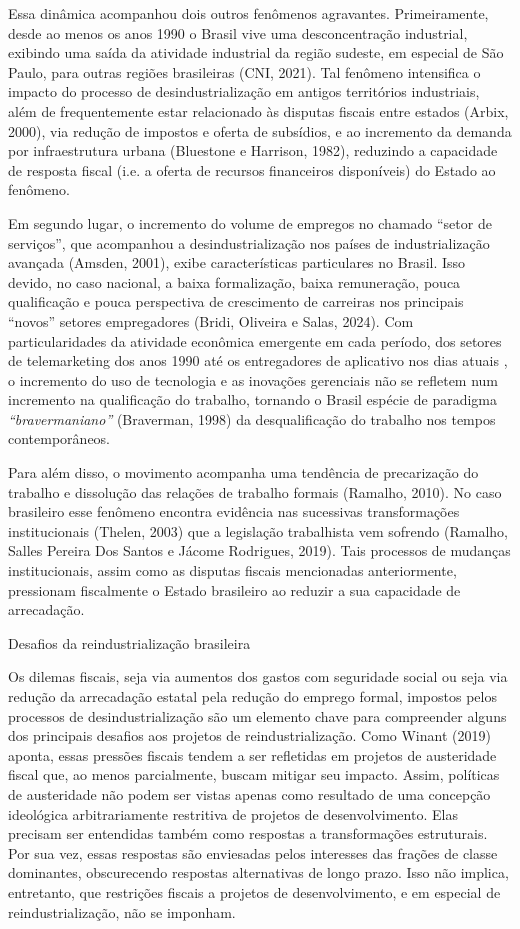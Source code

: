 Essa dinâmica acompanhou dois outros fenômenos agravantes.
Primeiramente, desde ao menos os anos 1990 o Brasil vive uma
desconcentração industrial, exibindo uma saída da atividade industrial
da região sudeste, em especial de São Paulo, para outras regiões
brasileiras (CNI, 2021). Tal fenômeno intensifica o impacto do processo
de desindustrialização em antigos territórios industriais, além de
frequentemente estar relacionado às disputas fiscais entre estados
(Arbix, 2000), via redução de impostos e oferta de subsídios, e ao
incremento da demanda por infraestrutura urbana (Bluestone e Harrison,
1982), reduzindo a capacidade de resposta fiscal (i.e. a oferta de
recursos financeiros disponíveis) do Estado ao fenômeno.

Em segundo lugar, o incremento do volume de empregos no chamado ``setor
de serviços'', que acompanhou a desindustrialização nos países de
industrialização avançada (Amsden, 2001), exibe características
particulares no Brasil. Isso devido, no caso nacional, a baixa
formalização, baixa remuneração, pouca qualificação e pouca perspectiva
de crescimento de carreiras nos principais ``novos'' setores
empregadores (Bridi, Oliveira e Salas, 2024). Com particularidades da
atividade econômica emergente em cada período, dos setores de
telemarketing dos anos 1990 até os entregadores de aplicativo nos dias
atuais , o incremento do uso de tecnologia e as inovações gerenciais não
se refletem num incremento na qualificação do trabalho, tornando o
Brasil espécie de paradigma \emph{``bravermaniano''} (Braverman, 1998)
da desqualificação do trabalho nos tempos contemporâneos.

Para além disso, o movimento acompanha uma tendência de precarização do
trabalho e dissolução das relações de trabalho formais (Ramalho, 2010).
No caso brasileiro esse fenômeno encontra evidência nas sucessivas
transformações institucionais (Thelen, 2003) que a legislação
trabalhista vem sofrendo (Ramalho, Salles Pereira Dos Santos e Jácome
Rodrigues, 2019). Tais processos de mudanças institucionais, assim como
as disputas fiscais mencionadas anteriormente, pressionam fiscalmente o
Estado brasileiro ao reduzir a sua capacidade de arrecadação.

Desafios da reindustrialização brasileira

Os dilemas fiscais, seja via aumentos dos gastos com seguridade social
ou seja via redução da arrecadação estatal pela redução do emprego
formal, impostos pelos processos de desindustrialização são um elemento
chave para compreender alguns dos principais desafios aos projetos de
reindustrialização. Como Winant (2019) aponta, essas pressões fiscais
tendem a ser refletidas em projetos de austeridade fiscal que, ao menos
parcialmente, buscam mitigar seu impacto. Assim, políticas de
austeridade não podem ser vistas apenas como resultado de uma concepção
ideológica arbitrariamente restritiva de projetos de desenvolvimento.
Elas precisam ser entendidas também como respostas a transformações
estruturais. Por sua vez, essas respostas são enviesadas pelos
interesses das frações de classe dominantes, obscurecendo respostas
alternativas de longo prazo. Isso não implica, entretanto, que
restrições fiscais a projetos de desenvolvimento, e em especial de
reindustrialização, não se imponham.

